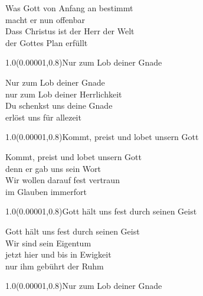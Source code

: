\documentclass[aspectratio=169]{beamer}
\begin{document}
\begin{frame}
\centering
\color{white}
\huge{Was Gott von Anfang an bestimmt} \\
\huge{macht er nun offenbar} \\
\huge{Dass Christus ist der Herr der Welt} \\
\huge{der Gottes Plan erfüllt} \\

\begin{textblock}{1.0}(0.00001,0.8)\color{gray}\normalsize{Nur zum Lob deiner Gnade}\end{textblock}
\end{frame}

\begin{frame}
\centering
\color{white}
\huge{Nur zum Lob deiner Gnade} \\
\huge{nur zum Lob deiner Herrlichkeit} \\
\huge{Du schenkst uns deine Gnade} \\
\huge{erlöst uns für allezeit} \\

\begin{textblock}{1.0}(0.00001,0.8)\color{gray}\normalsize{Kommt, preist und lobet unsern Gott}\end{textblock}
\end{frame}

\begin{frame}
\centering
\color{white}
\huge{Kommt, preist und lobet unsern Gott} \\
\huge{denn er gab uns sein Wort} \\
\huge{Wir wollen darauf fest vertraun} \\
\huge{im Glauben immerfort} \\

\begin{textblock}{1.0}(0.00001,0.8)\color{gray}\normalsize{Gott hält uns fest durch seinen Geist}\end{textblock}
\end{frame}

\begin{frame}
\centering
\color{white}
\huge{Gott hält uns fest durch seinen Geist} \\
\huge{Wir sind sein Eigentum} \\
\huge{jetzt hier und bis in Ewigkeit} \\
\huge{nur ihm gebührt der Ruhm} \\

\begin{textblock}{1.0}(0.00001,0.8)\color{gray}\normalsize{Nur zum Lob deiner Gnade}\end{textblock}
\end{frame}
\end{document}
